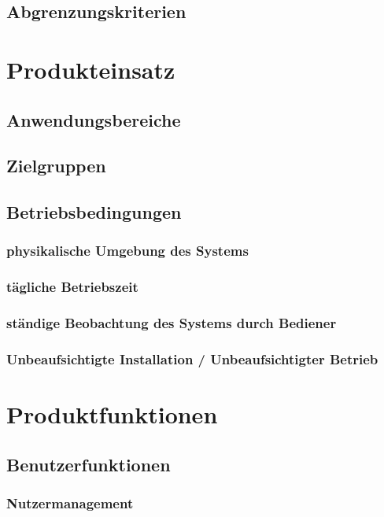 \documentclass[a4paper,11pt]{article}             %
\begin{document}
	\subsection{Abgrenzungskriterien}
\section{Produkteinsatz}
	\subsection{Anwendungsbereiche}
	\subsection{Zielgruppen}
	\subsection{Betriebsbedingungen}
		\subsubsection{physikalische Umgebung des Systems}
		\subsubsection{tägliche Betriebszeit}
		\subsubsection{ständige Beobachtung des Systems durch Bediener}
		\subsubsection{Unbeaufsichtigte Installation / Unbeaufsichtigter Betrieb}




\section{Produktfunktionen}
	\subsection{Benutzerfunktionen}
		\subsubsection{Nutzermanagement}
\end{document}
